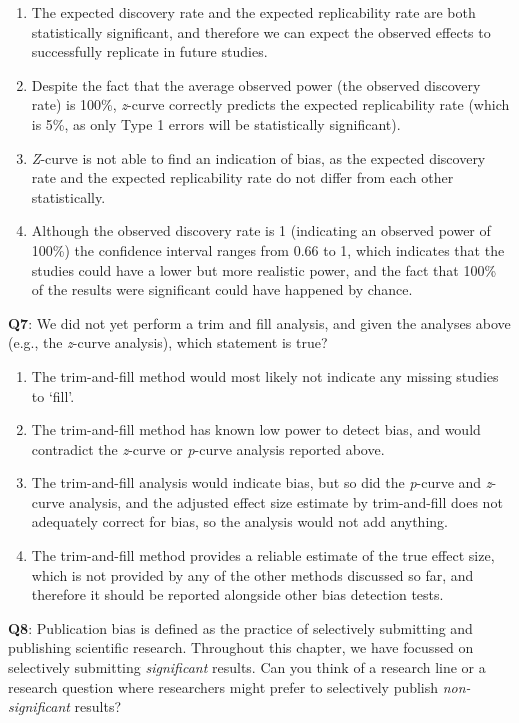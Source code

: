\documentclass[
  oneside]{book}
\providecommand{\tightlist}{%
  \setlength{\itemsep}{0pt}\setlength{\parskip}{0pt}}
\begin{document}
\begin{enumerate}
\def\labelenumi{\Alph{enumi})}
\tightlist
\item
  The expected discovery rate and the expected replicability rate are both statistically significant, and therefore we can expect the observed effects to successfully replicate in future studies.
\item
  Despite the fact that the average observed power (the observed discovery rate) is 100\%, \emph{z}-curve correctly predicts the expected replicability rate (which is 5\%, as only Type 1 errors will be statistically significant).
\item
  \emph{Z}-curve is not able to find an indication of bias, as the expected discovery rate and the expected replicability rate do not differ from each other statistically.
\item
  Although the observed discovery rate is 1 (indicating an observed power of 100\%) the confidence interval ranges from 0.66 to 1, which indicates that the studies could have a lower but more realistic power, and the fact that 100\% of the results were significant could have happened by chance.
\end{enumerate}

\textbf{Q7}: We did not yet perform a trim and fill analysis, and given the analyses above (e.g., the \emph{z}-curve analysis), which statement is true?

\begin{enumerate}
\def\labelenumi{\Alph{enumi})}
\tightlist
\item
  The trim-and-fill method would most likely not indicate any missing studies to `fill'.
\item
  The trim-and-fill method has known low power to detect bias, and would contradict the \emph{z}-curve or \emph{p}-curve analysis reported above.
\item
  The trim-and-fill analysis would indicate bias, but so did the \emph{p}-curve and \emph{z}-curve analysis, and the adjusted effect size estimate by trim-and-fill does not adequately correct for bias, so the analysis would not add anything.
\item
  The trim-and-fill method provides a reliable estimate of the true effect size, which is not provided by any of the other methods discussed so far, and therefore it should be reported alongside other bias detection tests.
\end{enumerate}

\textbf{Q8}: Publication bias is defined as the practice of selectively submitting and publishing scientific research. Throughout this chapter, we have focussed on selectively submitting \emph{significant} results. Can you think of a research line or a research question where researchers might prefer to selectively publish \emph{non-significant} results?
\end{document}
